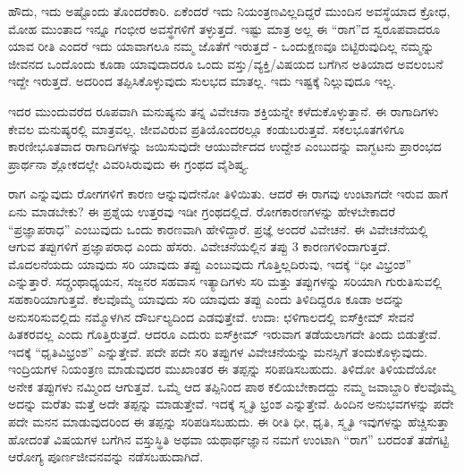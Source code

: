 {ಹೌದು, ಇದು ಅಷ್ಟೊಂದು ತೊಂದರೆಕಾರಿ. ಏಕೆಂದರೆ ಇದು ನಿಯಂತ್ರಣವಿಲ್ಲದಿದ್ದರೆ  ಮುಂದಿನ ಅವಸ್ಥೆಯಾದ ಕ್ರೋಧ, ಮೋಹ ಮುಂತಾದ ಇನ್ನೂ ಗಂಭೀರ ಅವಸ್ಥೆಗಳಿಗೆ ತಳ್ಳುತ್ತದೆ. ಇಷ್ಟು ಮಾತ್ರ ಅಲ್ಲ ಈ “ರಾಗ”ದ ಸ್ವರೂಪವಾದರೂ ಯಾವ ರೀತಿ ಎಂದರೆ ಇದು ಯಾವಾಗಲೂ ನಮ್ಮ ಜೊತೆಗೆ ಇರುತ್ತದೆ - ಒಂದುಕ್ಷಣವೂ ಬಿಟ್ಟಿರುವುದಿಲ್ಲ \break ನಮ್ಮನ್ನು ಜೀವನದ ಒಂದೊಂದು ಕೂಡಾ ಯಾವುದಾದರೂ ಒಂದು ವಸ್ತು/ವ್ಯಕ್ತಿ/ವಿಷ\-ಯದ ಬಗೆಗಿನ ಅತಿಯಾದ ಅವಲಂಬನೆ ಇದ್ದೇ ಇರುತ್ತದೆ. ಅದರಿಂದ ತಪ್ಪಿಸಿಕೊಳ್ಳುವುದು ಸುಲಭದ ಮಾತಲ್ಲ. ಇದು ಇಷ್ಟಕ್ಕೆ ನಿಲ್ಲುವುದೂ ಇಲ್ಲ.

ಇದರ ಮುಂದುವರೆದ ರೂಪವಾಗಿ ಮನುಷ್ಯನು ತನ್ನ ವಿವೇಚನಾ ಶಕ್ತಿಯನ್ನೇ ಕಳೆದು\-ಕೊಳ್ಳುತ್ತಾನೆ. ಈ ರಾಗಾದಿಗಳು ಕೇವಲ ಮನುಷ್ಯರಲ್ಲಿ ಮಾತ್ರವಲ್ಲ. ಜೀವವಿರುವ ಪ್ರತಿಯೊಂದರಲ್ಲೂ ಕಂಡುಬರುತ್ತವೆ.  ಸಕಲಭೂತಗಳಿಗೂ ಕಾರಣೀಭೂತವಾದ ರಾಗಾದಿಗಳನ್ನು ಜಯಿಸುವುದೇ ಆಯುರ್ವೇದದ ಉದ್ದೇಶ ಎಂಬುದನ್ನು ವಾಗ್ಭಟನು ಪ್ರಾರಂಭದ ಪ್ರಾರ್ಥನಾ ಶ್ಲೋಕದಲ್ಲೇ ವಿವರಿಸಿರುವುದು ಈ ಗ್ರಂಥದ ವೈಶಿಷ್ತ್ಯ.

ರಾಗ ಎನ್ನುವುದು ರೋಗಗಳಿಗೆ ಕಾರಣ ಆನ್ನುವುದೇನೋ ತಿಳಿಯಿತು. ಆದರೆ ಈ ರಾಗವು ಉಂಟಾಗದೇ ಇರುವ ಹಾಗೆ ಏನು ಮಾಡಬೇಕು? ಈ ಪ್ರಶ್ನೆಯ ಉತ್ತರವು ಇಡೀ ಗ್ರಂಥದಲ್ಲಿದೆ. ರೋಗಕಾರಣಗಳನ್ನು ಹೇಳಬೇಕಾದರೆ “ಪ್ರಜ್ಞಾಪರಾಧ” ಎಂಬುವುದು ಒಂದು ಕಾರಣವಾಗಿ ಹೇಳಿದ್ದಾರೆ. ಪ್ರಜ್ಞೆ ಅಂದರೆ ವಿವೇಚನೆ. ಈ ವಿವೇಚನೆಯಲ್ಲಿ ಆಗುವ ತಪ್ಪುಗಳಿಗೆ ಪ್ರಜ್ಞಾಪರಾಧ ಎಂದು ಹೆಸರು. ವಿವೇಚನೆಯಲ್ಲಿನ ತಪ್ಪು 3 ಕಾರಣಗಳಿಂದಾಗುತ್ತದೆ. ಮೊದಲನೆಯದು ಯಾವುದು ಸರಿ ಯಾವುದು ತಪ್ಪು ಎಂಬುವುದು ಗೊತ್ತಿಲ್ಲದಿರುವು, ಇದಕ್ಕೆ “ಧೀ ವಿಭ್ರಂಶ” ಎನ್ನುತ್ತಾರೆ. ಸದ್ಗ್ರಂಥಾಧ್ಯಯನ, ಸಜ್ಜನರ ಸಹವಾಸ ಇತ್ಯಾದಿಗಳು ಸರಿ ಮತ್ತು ತಪ್ಪುಗಳನ್ನು ಸರಿಯಾಗಿ ಗುರುತಿಸುವಲ್ಲಿ ಸಹಕಾರಿಯಾಗುತ್ತವೆ. ಕೆಲವೊಮ್ಮೆ ಯಾವುದು ಸರಿ ಯಾವುದು ತಪ್ಪು ಎಂದು ತಿಳಿದಿದ್ದರೂ ಕೂಡಾ ಅದನ್ನು ಅನುಸರಿಸುವಲ್ಲಿದು ನಮ್ಮೊಳಗಿನ ದೌರ್ಬಲ್ಯದಿಂದ ಎಡವುತ್ತೇವೆ. ಉದಾ: ಛಳಿಗಾಲದಲ್ಲಿ  ಐಸ್‍ಕ್ರೀಮ್ ಸೇವನೆ ಹಿತಕರವಲ್ಲ ಎಂದು ಗೊತ್ತಿರುತ್ತದೆ. ಆದರೂ ಎದುರು ಐಸ್‍ಕ್ರೀಮ್ ಇರುವಾಗ ತಡೆಯಲಾಗದೇ ತಿಂದು ಬಿಡುತ್ತೇವೆ. ಇದಕ್ಕೆ “ಧೃತಿ\-ವಿಭ್ರಂಶ” ಎನ್ನುತ್ತೇವೆ. ಪದೇ ಪದೇ ಸರಿ ತಪ್ಪುಗಳ ವಿವೇಚನೆಯನ್ನು ಮನಸ್ಸಿಗೆ ತಂದುಕೊಳ್ಳುವುದು. ಇಂದ್ರಿಯಗಳ ನಿಯಂತ್ರಣ ಮಾಡುವುದರ ಮುಖಾಂತರ ಈ ತಪ್ಪನ್ನು ಸರಿಪಡಿಸ\-\break ಬಹುದು. ತಿಳಿದೋ ತಿಳಿಯದೆಯೋ ಅನೇಕ ತಪ್ಪುಗಳು ನಮ್ಮಿಂದ ಆಗುತ್ತವೆ. ಒಮ್ಮೆ ಆದ ತಪ್ಪಿನಿಂದ ಪಾಠ ಕಲಿಯಬೇಕಾದದ್ದು ನಮ್ಮ ಜವಾಬ್ದಾರಿ ಕೆಲವೊಮ್ಮೆ ಅದನ್ನು ಮರೆತು ಮತ್ತೆ ಅದೇ ತಪ್ಪನ್ನು ಮಾಡುತ್ತೇವೆ. ಇದಕ್ಕೆ ಸ್ಮೃತಿ ಭ್ರಂಶ ಎನ್ನುತ್ತೇವೆ. ಹಿಂದಿನ ಅನುಭವಗಳನ್ನು ಪದೇ ಪದೇ ಮನನ ಮಾಡುವುದರಿಂದ ಈ ತಪ್ಪನ್ನು ಸರಿಪಡಿಸಬಹುದು. 
ಈ ರೀತಿ ಧೀ, ಧೃತಿ, ಸ್ಮೃತಿ ಇವುಗಳನ್ನು ಹೆಚ್ಚಿಸುತ್ತಾ ಹೋದಂತೆ ವಿಷಯಗಳ ಬಗೆಗಿನ ವಸ್ತುಸ್ಥಿತಿ ಅಥವಾ ಯಥಾರ್ಥಜ್ಞಾನ ನಮಗೆ ಉಂಟಾಗಿ “ರಾಗ” ಬರದಂತೆ ತಡೆಗಟ್ಟಿ ಆರೋಗ್ಯ ಪೂರ್ಣಜೀವನವನ್ನು ನಡೆಸಬಹುದಾಗಿದೆ.

\articleend
}
